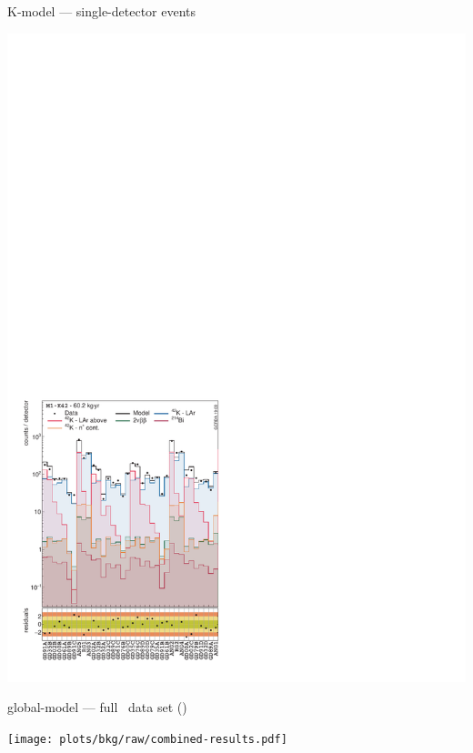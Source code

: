 \documentclass[10pt,aspectratio=169]{beamer}
\begin{document}
\begin{frame}{K-model --- single-detector events}
\begin{center}
    \includegraphics[height=0.85\textheight]{plots/bkg/raw/ph2/results/kmodel/kmodel-1d-ds1.pdf}
  \end{center}
\end{frame}
\begin{frame}[plain]{global-model --- full \phasetwo\ data set (\gexpobkg)}
  \begin{center}
    \texttt{[image: plots/bkg/raw/combined-results.pdf]}
  \end{center}
\end{frame}
\end{document}
